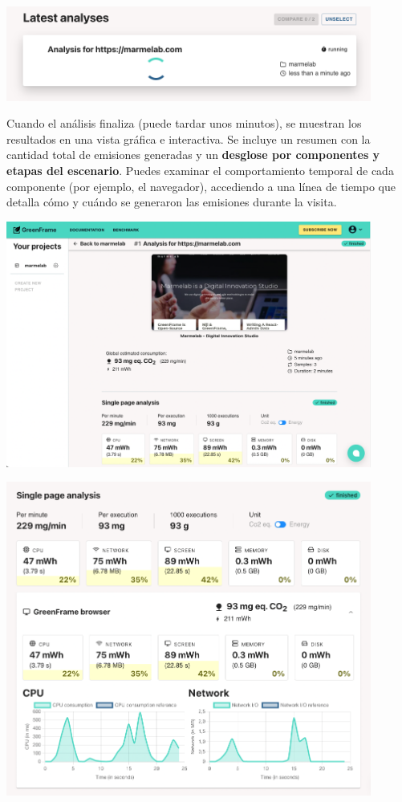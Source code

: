 \documentclass[12pt,a4paper]{report}
\begin{document}
\begin{center}
  \includegraphics[width=0.9\textwidth]{imagenes/Greenframe_4.png}
\end{center}

Cuando el análisis finaliza (puede tardar unos minutos), se muestran los
resultados en una vista gráfica e interactiva. Se incluye un resumen con la
cantidad total de emisiones generadas y un \textbf{desglose por componentes y
  etapas del escenario}. Puedes examinar el comportamiento temporal de cada
componente (por ejemplo, el navegador), accediendo a una línea de tiempo que
detalla cómo y cuándo se generaron las emisiones durante la visita.

\begin{center}
  \includegraphics[width=0.9\textwidth]{imagenes/Greenframe_5.png}
\end{center}

\begin{center}
  \includegraphics[width=0.9\textwidth]{imagenes/Greenframe_6.png}
\end{center}
\end{document}
